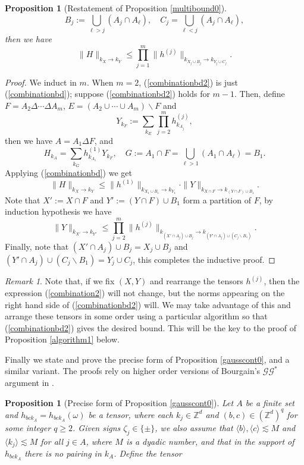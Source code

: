\documentclass[11 pt,reqno]{amsart}
\newtheorem{prop}[thm]{Proposition}
\theoremstyle{definition}
\theoremstyle{remark}
\newtheorem{rem}[thm]{Remark}
\numberwithin{equation}{section}
\newcommand{\Zb}{\mathbb{Z}}
\begin{document}
{\begin{prop}[Restatement of Proposition \ref{multibound0}]
 \begin{equation}\label{intermedsets}B_j:=\bigcup_{\ell>j}(A_j\cap A_\ell),\quad C_j=\bigcup_{\ell<j}(A_j\cap A_\ell),
 \end{equation} then we have
 \begin{equation}\label{combinationbd2}\|H\|_{k_X\to k_Y}\leq\prod_{j=1}^m\|h^{(j)}\|_{k_{X_j\cup B_j}\to k_{Y_j\cup C_j}}.
 \end{equation} 
 \end{prop}
 \begin{proof} We induct in $m$. When $m=2$, (\ref{combinationbd2}) is just (\ref{combinationbd}); suppose (\ref{combinationbd2}) holds for $m-1$. Then, define $F=A_2\Delta\cdots\Delta A_m$, $E=(A_2\cup\cdots \cup A_m)\backslash F$ and
 \[Y_{k_F}:=\sum_{k_E}\prod_{j=2}^mh_{k_{A_j}}^{(j)},\] then we have $A =A_1\Delta F$, and
 \[H_{k_A}=\sum_{k_G}h_{k_{A_1}}^{(1)}Y_{k_F},\quad G:=A_1\cap F=\bigcup_{\ell>1}(A_1\cap A_\ell)=B_1.\] Applying (\ref{combinationbd}) we get
 \[\|H\|_{k_X\to k_Y}\leq\|h^{(1)}\|_{k_{X_1\cup B_1}\to k_{Y_1}}\cdot\|Y\|_{k_{X\cap F}\to k_{(Y\cap F)\cup B_1}}.\] Note that $X':=X\cap F$ and $Y':=(Y\cap F)\cup B_1$ form a partition of $F$, by induction hypothesis we have
 \[\|Y\|_{k_{X'}\to k_{Y'}}\leq \prod_{j=2}^m\|h^{(j)}\|_{k_{(X'\cap A_j)\cup B_j}\to k_{(Y'\cap A_j)\cup (C_j\backslash B_1)}}.\] Finally, note that $(X'\cap A_j)\cup B_j= X_j\cup B_j$ and $(Y'\cap A_j)\cup (C_j\backslash B_1)=Y_j\cup C_j$, this completes the inductive proof.
 \end{proof}
 \begin{rem} Note that, if we fix $(X,Y)$ and rearrange the tensors $h^{(j)}$, then the expression (\ref{combination2}) will not change, but the norms appearing on the right hand side of (\ref{combinationbd2}) will. We may take advantage of this and arrange these tensors in some order using a particular algorithm so that (\ref{combinationbd2}) gives the desired bound. This will be the key to the proof of Proposition \ref{algorithm1} below.
 \end{rem}
 Finally we state and prove the precise form of Proposition \ref{gausscont0}, and a similar variant. The proofs rely on higher order versions of Bourgain's $\mathscr{G}\mathscr{G}^*$ argument in \cite{Bourgain}.
  \begin{prop}[Precise form of Proposition \ref{gausscont0}]\label{gausscont} Let $A$ be a finite set and $h_{bck_A}=h_{bck_A}(\omega)$ be a tensor, where each $k_j\in \Zb^d$ and $(b,c)\in (\Zb^d)^q$ for some integer $q\geq 2$. Given signs $\zeta_j\in\{\pm\}$, we also assume that $\langle b\rangle,\langle c\rangle\lesssim M$ and $\langle k_j\rangle\lesssim M$ for all $j\in A$, where $M$ is a dyadic number, and that in the support of $h_{bck_A}$ there is no pairing in $k_A$. Define the tensor

\end{prop}}
\end{document}
